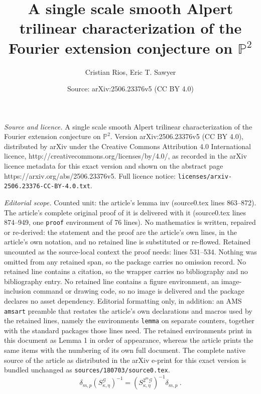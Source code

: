 \documentclass[10pt,a4paper]{amsart}
\title{A single scale smooth Alpert trilinear characterization of the Fourier extension conjecture on $\mathbb{P}^{2}$}
\author{Cristian Rios, Eric T. Sawyer}
\date{Source: arXiv:2506.23376v5 (CC BY 4.0)}
\begin{document}
\maketitle

\noindent\emph{Source and licence.} A single scale smooth Alpert trilinear characterization of the Fourier extension conjecture on $\mathbb{P}^{2}$. Version arXiv:2506.23376v5 (CC BY 4.0), distributed by arXiv under the Creative Commons Attribution 4.0 International licence, http://creativecommons.org/licenses/by/4.0/, as recorded in the arXiv licence metadata for this exact version and shown on the abstract page https://arxiv.org/abs/2506.23376v5. Full licence notice: \texttt{licenses/arxiv-2506.23376-CC-BY-4.0.txt}.\par\smallskip

\noindent\textit{Editorial scope.} Counted unit: the article's lemma inv (source0.tex lines 863--872). The article's complete original proof of it is delivered with it (source0.tex lines 874--949, one \texttt{proof} environment of 76 lines). No mathematics is written, repaired or re-derived: the statement and the proof are the article's own lines, in the article's own notation, and no retained line is substituted or re-flowed.  Retained uncounted as the source-local context the proof needs: lines 531--534.  Nothing was omitted from any retained span, so the package carries no omission record.  No retained line contains a citation, so the wrapper carries no bibliography and no bibliography entry.  No retained line contains a figure environment, an image-inclusion command or drawing code, so no image is delivered and the package declares no asset dependency.  Editorial formatting only, in addition: an AMS \texttt{amsart} preamble that restates the article's own declarations and macros used by the retained lines, namely the environments \texttt{lemma} on separate counters, together with the standard packages those lines need.  The retained environments print in this document as Lemma 1 in order of appearance, whereas the article prints the same items with the numbering of its own full document.  The complete native source of the article as distributed in the arXiv e-print for this exact version is bundled unchanged as \texttt{sources/180703/source0.tex}.
\begin{equation}
\delta_{m,p}\left(  S_{\kappa,\eta}^{\mathcal{G}}\right)  ^{-1}=\left(
S_{\kappa,\eta}^{2^{m}\mathcal{G}}\right)  ^{-1}\delta_{m,p}\ .\label{claim}%
\end{equation}
\end{document}
